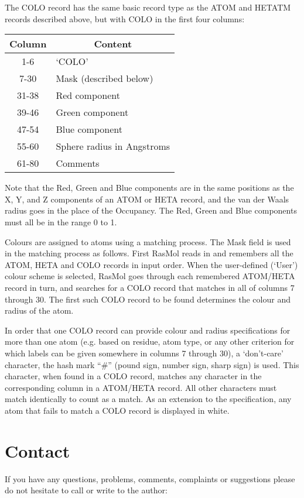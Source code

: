 The COLO record has the same basic record type as the ATOM and HETATM
records described above, but with COLO in the first four columns:

\begin{center}\begin{tabular}{|c|l|} \hline
{\bf Column} & \multicolumn{1}{c|}{\bf Content} \\ \hline
1-6   & `COLO' \\
7-30  & Mask (described below) \\
31-38 & Red component \\
39-46 & Green component \\
47-54 & Blue component \\
55-60 & Sphere radius in Angstroms \\
61-80 & Comments \\ \hline
\end{tabular}\end{center}

Note that the Red, Green and Blue components are in the same positions
as the X, Y, and Z components of an ATOM or HETA record, and the van
der Waals radius goes in the place of the Occupancy. The Red, Green and
Blue components must all be in the range 0 to 1.

Colours are assigned to atoms using a matching process. The Mask field
is used in the matching process as follows. First RasMol reads in and
remembers all the ATOM, HETA and COLO records in input order. When the
user-defined (`User') colour scheme is selected, RasMol goes through each 
remembered ATOM/HETA record in turn, and searches for a COLO record 
that matches in all of columns 7 through 30. The first such COLO record
to be found determines the colour and radius of the atom.

In order that one COLO record can provide colour and radius specifications
for more than one atom (e.g. based on residue, atom type, or any other
criterion for which labels can be given somewhere in columns 7 through 
30), a `don't-care' character, the hash mark ``\#'' (pound sign, number sign,
sharp sign) is used. This character, when found in a COLO record, matches 
any character in the corresponding column in a ATOM/HETA record. All other 
characters must match identically to count as a match. As an extension to 
the specification, any atom that fails to match a COLO record is displayed 
in white.


\section{Contact}
\label{Contact}
If you have any questions, problems, comments, complaints or suggestions
please do not hesitate to call or write to the author:

